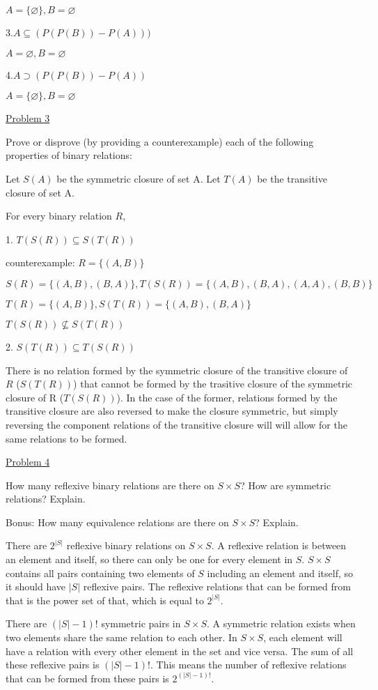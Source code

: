 \documentclass{article}
\begin{document}
$A = \{\varnothing\}, B = \varnothing$\newline

3.$A \subseteq (P(P(B)) - P(A)))$

$A = \varnothing, B = \varnothing$\newline

4.$A \supset (P(P(B)) - P(A))$

$A = \{\varnothing\}, B = \varnothing$\newline

\underline{Problem 3}

Prove or disprove (by providing a counterexample) each of the following properties of binary relations:

Let $S(A)$ be the symmetric closure of set A. Let $T(A)$ be the transitive closure of set A.

For every binary relation $R$,

1. $T(S(R)) \subseteq S(T(R))$

counterexample: $R = \{(A,B)\}$ 

$S(R) = \{(A,B),(B,A)\}, T(S(R)) = \{(A,B),(B,A),(A,A),(B,B)\}$

$T(R) = \{(A,B)\}, S(T(R)) = \{(A,B),(B,A)\}$

$T(S(R)) \not\subseteq S(T(R))$\newline

2. $S(T(R)) \subseteq T(S(R))$

There is no relation formed by the symmetric closure of the transitive closure of $R$ ($S(T(R))$) that cannot be formed by the trasitive closure of the symmetric closure of R ($T(S(R))$). In the case of the former, relations formed by the transitive closure are also reversed to make the closure symmetric, but simply reversing the component relations of the transitive closure will will allow for the same relations to be formed.\newline

\underline{Problem 4}

How many reflexive binary relations are there on $S \times S$? How are symmetric relations? Explain.

Bonus: How many equivalence relations are there on $S \times S$? Explain.

There are $2^{|S|}$ reflexive binary relations on $S \times S$. A reflexive relation is between an element and itself, so there can only be one for every element in $S$. $S \times S$ contains all pairs containing two elements of $S$ including an element and itself, so it should have $|S|$ reflexive pairs. The reflexive relations that can be formed from that is the power set of that, which is equal to $2^{|S|}$.

There are $(|S|-1)!$ symmetric pairs in $S \times S$. A symmetric relation exists when two elements share the same relation to each other. In $S \times S$, each element will have a relation with every other element in the set and vice versa. The sum of all these reflexive pairs is $(|S| - 1)!$. This means the number of reflexive relations that can be formed from these pairs is $2^{(|S|-1)!}$.
\end{document}

